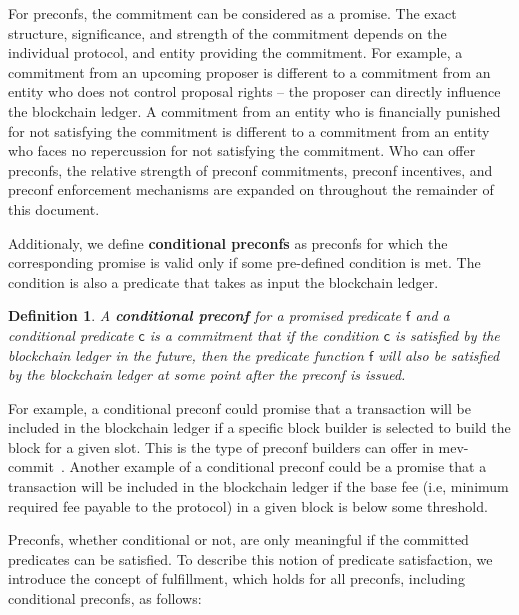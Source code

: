 \documentclass[a4paper]{article}
\theoremstyle{boldstyle}
\newtheorem{definitionx}{Definition}
\newenvironment{definition}
  {\begin{defopenboxq}\begin{definitionx}}
  {\end{definitionx}\end{defopenboxq}}
\newcommand{\todoks}[1]{\todo[color=purple!40]{\textbf{Katerina:} #1}}
\begin{document}
        For preconfs, the commitment can be considered as a promise. The exact structure, significance, and strength of the commitment depends on the individual protocol, and entity providing the commitment.
        For example, a commitment from an upcoming proposer is different to a commitment from an entity who does not control proposal rights -- the proposer can directly influence the blockchain ledger. A commitment from an entity who is financially punished for not satisfying the commitment is different to a commitment from an entity who faces no repercussion for not satisfying the commitment. Who can offer preconfs, the relative strength of preconf commitments, preconf incentives, and preconf enforcement mechanisms are expanded on throughout the remainder of this document. %

        Additionaly, we define \textbf{conditional preconfs} as preconfs for which the corresponding promise is valid only if some pre-defined condition is met. The condition is also a predicate that takes as input the blockchain ledger.

        \begin{definition}
            A \textbf{conditional preconf} for a promised predicate  $\mathsf{f}$ and a conditional predicate $\mathsf{c}$ is a commitment that if the condition $\mathsf{c}$ is satisfied by the blockchain ledger in the future, then the predicate function $\mathsf{f}$ will also be satisfied by the blockchain ledger at some point after the preconf is issued. 
        \end{definition}
        For example, a conditional preconf could promise that a transaction will be included in the blockchain ledger if a specific block builder is selected to build the block for a given slot. This is the type of preconf builders can offer in mev-commit~\cite{W:Documentation-Understandingmev-commit}. Another example of a conditional preconf could be a promise that a transaction will be included in the blockchain ledger if the base fee (i.e, minimum required fee payable to the protocol) in a given block is below some threshold. 

         Preconfs, whether conditional or not, are only meaningful if the committed predicates can be satisfied. To describe this notion of predicate satisfaction, we introduce the concept of fulfillment, which holds for all preconfs, including conditional preconfs, as follows: 
\end{document}

